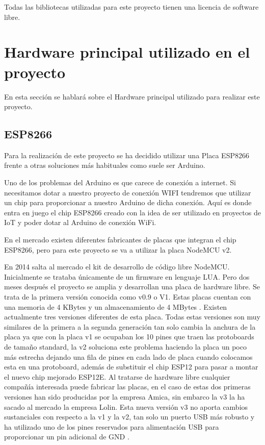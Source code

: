 Todas las bibliotecas utilizadas para este proyecto tienen una licencia de software libre.

\section{Hardware principal utilizado en el proyecto}

En esta sección se hablará sobre el Hardware principal utilizado para realizar este proyecto.

\subsection{ESP8266}

Para la realización de este proyecto se ha decidido utilizar una Placa ESP8266 frente a otras soluciones más habituales como suele ser Arduino.

Uno de los problemas del Arduino es que carece de conexión a internet. Si necesitamos dotar a nuestro proyecto de conexión WIFI tendremos que utilizar un chip para proporcionar a nuestro Arduino de dicha conexión. Aquí es donde entra en juego el chip ESP8266 creado con la idea de ser utilizado en proyectos de IoT y poder dotar al Arduino de conexión WiFi.

En el mercado existen diferentes fabricantes de placas que integran el chip ESP8266, pero para este proyecto se va a utilizar la placa NodeMCU v2.

En 2014 salta al mercado el kit de desarrollo de código libre NodeMCU. Inicialmente se trataba únicamente de un firmware en lenguaje LUA. Pero dos meses después el proyecto se amplia y desarrollan una placa de hardware libre. Se trata de la primera versión conocida como v0.9 o V1. Estas placas cuentan con una memoria de 4 KBytes y un almacenamiento de 4 MBytes \cite{nodemcuwikipedia}. Existen actualmente tres versiones diferentes de esta placa. Todas estas versiones son muy similares de la primera a la segunda generación tan solo cambia la anchura de la placa ya que con la placa v1 se ocupaban los 10 pines que traen las protoboards de tamaño standard, la v2 soluciona este problema haciendo la placa un poco más estrecha dejando una fila de pines en cada lado de placa cuando colocamos esta en una protoboard, además de substituir el chip ESP12 para pasar a montar el nuevo chip mejorado ESP12E. Al tratarse de hardware libre cualquier compañía interesada puede fabricar las placas, en el caso de estas dos primeras versiones han sido producidas por la empresa Amica, sin embarco la v3 la ha sacado al mercado la empresa Lolin. Esta nueva versión v3 no aporta cambios sustanciales con respecto a la v1 y la v2, tan solo un puerto USB más robusto y ha utilizado uno de los pines reservados para alimentación USB para proporcionar un pin adicional de GND \cite{nodemcuversiones} .

